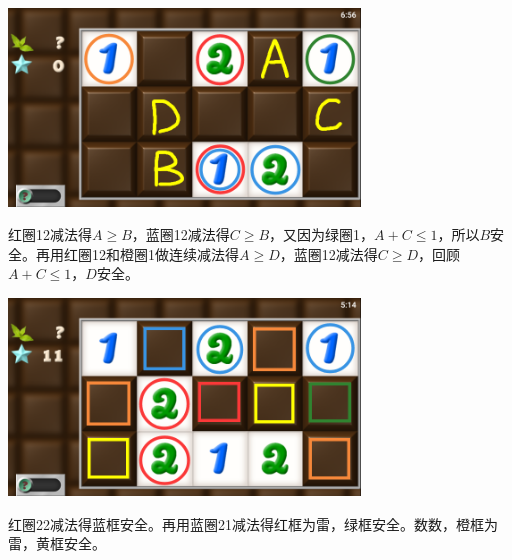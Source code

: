 \subsection{} %
\begin{center}
    \includegraphics[width=0.7\textwidth]{puzzle/78-1.png}
\end{center}
红圈12减法得$A\ge B$，蓝圈12减法得$C\ge B$，又因为绿圈1，$A+C\le 1$，所以$B$安全。再用红圈12和橙圈1做连续减法得$A\ge D$，蓝圈12减法得$C\ge D$，回顾$A+C\le 1$，$D$安全。
\begin{center}
    \includegraphics[width=0.7\textwidth]{puzzle/78-2.png}
\end{center}
红圈22减法得蓝框安全。再用蓝圈21减法得红框为雷，绿框安全。数数，橙框为雷，黄框安全。

